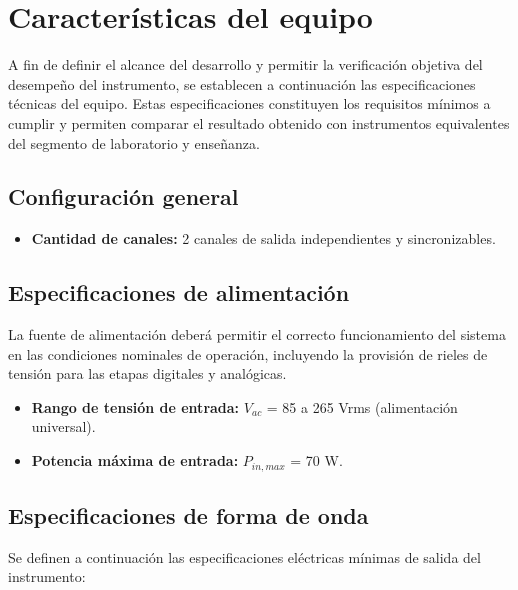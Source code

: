 \section{Características del equipo}
A fin de definir el alcance del desarrollo y permitir la verificación objetiva del desempeño del instrumento, se establecen a continuación las especificaciones técnicas del equipo. Estas especificaciones constituyen los requisitos mínimos a cumplir y permiten comparar el resultado obtenido con instrumentos equivalentes del segmento de laboratorio y enseñanza.

\subsection{Configuración general}

\begin{itemize}
	\item \textbf{Cantidad de canales:} 2 canales de salida independientes y sincronizables.
\end{itemize}

\subsection{Especificaciones de alimentación}

La fuente de alimentación deberá permitir el correcto funcionamiento del sistema en las condiciones nominales de operación, incluyendo la provisión de rieles de tensión para las etapas digitales y analógicas.

\begin{itemize}
	\item \textbf{Rango de tensión de entrada:} $V_{ac}$ = 85 a 265 Vrms (alimentación universal).
	\item \textbf{Potencia máxima de entrada:} $P_{in,max}$ = 70 W.
\end{itemize}

\subsection{Especificaciones de forma de onda}

Se definen a continuación las especificaciones eléctricas mínimas de salida del instrumento:

